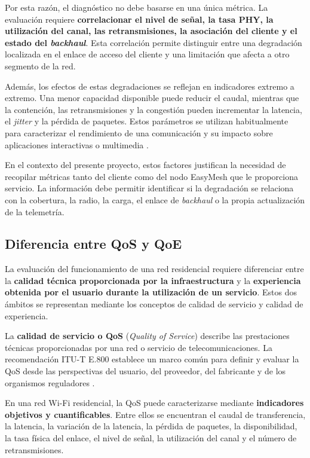 Por esta razón, el diagnóstico no debe basarse en una única métrica. La
evaluación requiere \textbf{correlacionar el nivel de señal, la tasa PHY,
la utilización del canal, las retransmisiones, la asociación del cliente
y el estado del \textit{backhaul}}. Esta correlación permite distinguir
entre una degradación localizada en el enlace de acceso del cliente y una
limitación que afecta a otro segmento de la red.

Además, los efectos de estas degradaciones se reflejan en indicadores
extremo a extremo. Una menor capacidad disponible puede reducir el
caudal, mientras que la contención, las retransmisiones y la congestión
pueden incrementar la latencia, el \textit{jitter} y la pérdida de
paquetes. Estos parámetros se utilizan habitualmente para caracterizar el
rendimiento de una comunicación y su impacto sobre aplicaciones
interactivas o multimedia \cite{itu_y1545}.

En el contexto del presente proyecto, estos factores justifican la
necesidad de recopilar métricas tanto del cliente como del nodo EasyMesh
que le proporciona servicio. La información debe permitir identificar si
la degradación se relaciona con la cobertura, la radio, la carga, el
enlace de \textit{backhaul} o la propia actualización de la telemetría.

\subsection{Diferencia entre QoS y QoE}
\label{subsec:diferencia-qos-qoe}

La evaluación del funcionamiento de una red residencial requiere
diferenciar entre la \textbf{calidad técnica proporcionada por la
infraestructura} y la \textbf{experiencia obtenida por el usuario durante
la utilización de un servicio}. Estos dos ámbitos se representan
mediante los conceptos de calidad de servicio y calidad de experiencia.

La \textbf{calidad de servicio o QoS}
(\textit{Quality of Service}) describe las prestaciones técnicas
proporcionadas por una red o servicio de telecomunicaciones. La
recomendación ITU-T E.800 establece un marco común para definir y evaluar
la QoS desde las perspectivas del usuario, del proveedor, del fabricante
y de los organismos reguladores \cite{itu_e800}.

En una red Wi-Fi residencial, la QoS puede caracterizarse mediante
\textbf{indicadores objetivos y cuantificables}. Entre ellos se
encuentran el caudal de transferencia, la latencia, la variación de la
latencia, la pérdida de paquetes, la disponibilidad, la tasa física del
enlace, el nivel de señal, la utilización del canal y el número de
retransmisiones.

